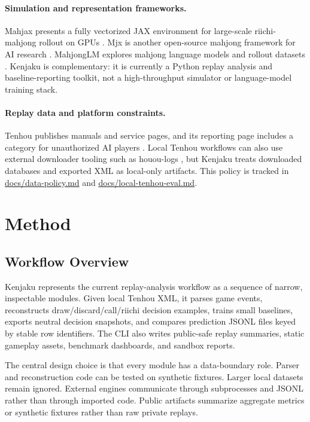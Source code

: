 \documentclass[11pt]{article}
\begin{document}
\paragraph{Simulation and representation frameworks.}
Mahjax presents a fully vectorized JAX environment for large-scale riichi-mahjong rollout on GPUs
\cite{mahjax-arxiv,mahjax-github}. Mjx is another open-source mahjong framework for AI research
\cite{mjx-cog}. MahjongLM explores mahjong language models and rollout datasets
\cite{mahjonglm-github,mahjonglm-hf}. Kenjaku is complementary: it is currently a Python replay
analysis and baseline-reporting toolkit, not a high-throughput simulator or language-model
training stack.

\paragraph{Replay data and platform constraints.}
Tenhou publishes manuals and service pages, and its reporting page includes a category for
unauthorized AI players \cite{tenhou-manual,tenhou-report}. Local Tenhou workflows can also use
external downloader tooling such as houou-logs \cite{houou-logs}, but Kenjaku treats downloaded
databases and exported XML as local-only artifacts. This policy is tracked in
\href{../data-policy.md}{docs/data-policy.md} and \href{../local-tenhou-eval.md}{docs/local-tenhou-eval.md}.

\section{Method}

\subsection{Workflow Overview}

Kenjaku represents the current replay-analysis workflow as a sequence of narrow, inspectable
modules. Given local Tenhou XML, it parses game events, reconstructs draw/discard/call/riichi
decision examples, trains small baselines, exports neutral decision snapshots, and compares
prediction JSONL files keyed by stable row identifiers. The CLI also writes public-safe replay
summaries, static gameplay assets, benchmark dashboards, and sandbox reports.

The central design choice is that every module has a data-boundary role. Parser and reconstruction
code can be tested on synthetic fixtures. Larger local datasets remain ignored. External engines
communicate through subprocesses and JSONL rather than through imported code. Public artifacts
summarize aggregate metrics or synthetic fixtures rather than raw private replays.
\end{document}
